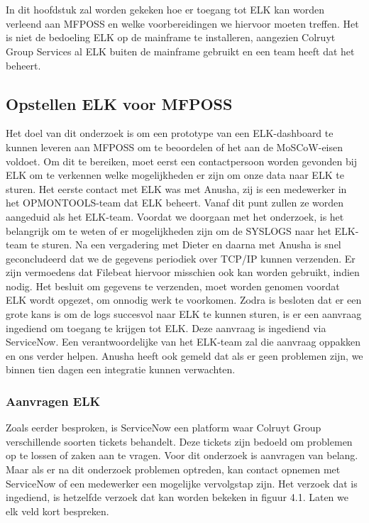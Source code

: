 \chapter{}%
\label{ch:Opstellen ELK}
In dit hoofdstuk zal worden gekeken hoe er toegang tot ELK kan worden verleend aan MFPOSS en welke voorbereidingen we hiervoor moeten treffen. Het is niet de bedoeling ELK op de mainframe te installeren, aangezien Colruyt Group Services al ELK buiten de mainframe gebruikt en een team heeft dat het beheert.

\section{Opstellen ELK voor MFPOSS}
Het doel van dit onderzoek is om een prototype van een ELK-dashboard te kunnen leveren aan MFPOSS om te beoordelen of het aan de MoSCoW-eisen voldoet. Om dit te bereiken, moet eerst een contactpersoon worden gevonden bij ELK om te verkennen welke mogelijkheden er zijn om onze data naar ELK te sturen. Het eerste contact met ELK was met Anusha, zij is een medewerker in het OPMONTOOLS-team dat ELK beheert. Vanaf dit punt zullen ze worden aangeduid als het ELK-team. Voordat we doorgaan met het onderzoek, is het belangrijk om te weten of er mogelijkheden zijn om de SYSLOGS naar het ELK-team te sturen. Na een vergadering met Dieter en daarna met Anusha is snel geconcludeerd dat we de gegevens periodiek over TCP/IP kunnen verzenden. Er zijn vermoedens dat Filebeat hiervoor misschien ook kan worden gebruikt, indien nodig. Het besluit om gegevens te verzenden, moet worden genomen voordat ELK wordt opgezet, om onnodig werk te voorkomen. Zodra is besloten dat er een grote kans is om de logs succesvol naar ELK te kunnen sturen, is er een aanvraag ingediend om toegang te krijgen tot ELK. Deze aanvraag is ingediend via ServiceNow. Een verantwoordelijke van het ELK-team zal die aanvraag oppakken en ons verder helpen. Anusha heeft ook gemeld dat als er geen problemen zijn, we binnen tien dagen een integratie kunnen verwachten.

\subsection{Aanvragen ELK}
Zoals eerder besproken, is ServiceNow een platform waar Colruyt Group verschillende soorten tickets behandelt. Deze tickets zijn bedoeld om problemen op te lossen of zaken aan te vragen. Voor dit onderzoek is aanvragen van belang. Maar als er na dit onderzoek problemen optreden, kan contact opnemen met ServiceNow of een medewerker een mogelijke vervolgstap zijn. Het verzoek dat is ingediend, is hetzelfde verzoek dat kan worden bekeken in figuur 4.1. Laten we elk veld kort bespreken.

